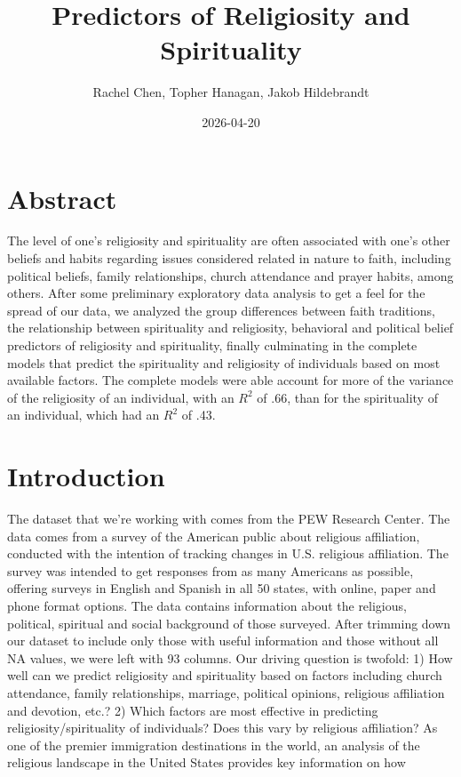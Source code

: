 \documentclass[
]{article}
\title{Predictors of Religiosity and Spirituality}
\author{Rachel Chen, Topher Hanagan, Jakob Hildebrandt}
\date{2026-04-20}
\begin{document}
\maketitle

\section{Abstract}\label{abstract}

The level of one's religiosity and spirituality are often associated
with one's other beliefs and habits regarding issues considered related
in nature to faith, including political beliefs, family relationships,
church attendance and prayer habits, among others. After some
preliminary exploratory data analysis to get a feel for the spread of
our data, we analyzed the group differences between faith traditions,
the relationship between spirituality and religiosity, behavioral and
political belief predictors of religiosity and spirituality, finally
culminating in the complete models that predict the spirituality and
religiosity of individuals based on most available factors. The complete
models were able account for more of the variance of the religiosity of
an individual, with an \(R^2\) of .66, than for the spirituality of an
individual, which had an \(R^2\) of .43.

\section{Introduction}\label{introduction}

The dataset that we're working with comes from the PEW Research Center.
The data comes from a survey of the American public about religious
affiliation, conducted with the intention of tracking changes in U.S.
religious affiliation. The survey was intended to get responses from as
many Americans as possible, offering surveys in English and Spanish in
all 50 states, with online, paper and phone format options. The data
contains information about the religious, political, spiritual and
social background of those surveyed. After trimming down our dataset to
include only those with useful information and those without all NA
values, we were left with 93 columns. Our driving question is twofold:
1) How well can we predict religiosity and spirituality based on factors
including church attendance, family relationships, marriage, political
opinions, religious affiliation and devotion, etc.? 2) Which factors are
most effective in predicting religiosity/spirituality of individuals?
Does this vary by religious affiliation? As one of the premier
immigration destinations in the world, an analysis of the religious
landscape in the United States provides key information on how
\end{document}
